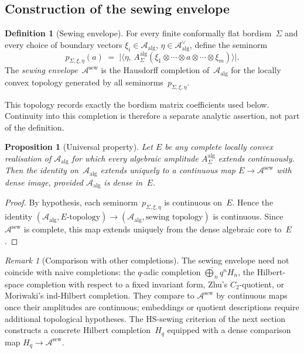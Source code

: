\documentclass[11pt,reqno]{amsart}
\newtheorem{proposition}[theorem]{Proposition}
\theoremstyle{definition}
\newtheorem{definition}[theorem]{Definition}
\theoremstyle{remark}
\newtheorem{remark}[theorem]{Remark}
\newcommand{\cA}{\mathcal{A}}
\numberwithin{equation}{section}
\begin{document}
\subsection{Construction of the sewing
 envelope}\label{subsec:sewing-envelope-construction}

\begin{definition}[Sewing envelope]\label{def:sewing-envelope}
For every finite conformally flat bordism~$\Sigma$ and every
choice of boundary vectors
$\xi_i \in \cA_{\mathrm{alg}}$,
$\eta \in \cA_{\mathrm{alg}}^\vee$, define the seminorm
\begin{equation}\label{eq:sewing-seminorm}
p_{\Sigma,\xi,\eta}(a)
\;=\;
\bigl|\langle \eta,\,
A_\Sigma^{\mathrm{alg}}
(\xi_1 \otimes \cdots \otimes a \otimes \cdots \otimes \xi_m)
\rangle\bigr|.
\end{equation}
The \emph{sewing envelope}~$\cA^{\mathrm{sew}}$ is the
Hausdorff completion of~$\cA_{\mathrm{alg}}$ for the locally
convex topology generated by all
seminorms~$p_{\Sigma,\xi,\eta}$.
\end{definition}

This topology records exactly the bordism matrix coefficients used
below. Continuity into this completion is therefore a separate
analytic assertion, not part of the definition.

\begin{proposition}[Universal property]
\label{prop:sewing-universal}
Let $E$ be any complete locally convex realisation of
$\cA_{\mathrm{alg}}$ for which every algebraic amplitude
$A_\Sigma^{\mathrm{alg}}$ extends continuously.  Then the
identity on~$\cA_{\mathrm{alg}}$ extends uniquely to a
continuous map $E \to \cA^{\mathrm{sew}}$ with dense image, provided
$\cA_{\mathrm{alg}}$ is dense in~$E$.
\end{proposition}

\begin{proof}
By hypothesis, each seminorm~$p_{\Sigma,\xi,\eta}$ is
continuous on~$E$.  Hence the identity
$(\cA_{\mathrm{alg}},E\text{-topology}) \to
(\cA_{\mathrm{alg}},\text{sewing topology})$ is continuous.  Since
$\cA^{\mathrm{sew}}$ is complete, this map extends uniquely from
the dense algebraic core to~$E$.
\end{proof}

\begin{remark}[Comparison with other completions]
\label{rem:completion-comparison}
The sewing envelope need not coincide with naive completions:
the $q$-adic completion
$\widehat{\bigoplus}_n q^n H_n$, the Hilbert-space completion
with respect to a fixed invariant form, Zhu's $C_2$-quotient,
or Moriwaki's ind-Hilbert completion.  They compare to
$\cA^{\mathrm{sew}}$ by continuous maps once their amplitudes are
continuous; embeddings or quotient descriptions require additional
topological hypotheses.  The HS-sewing criterion of the next section
constructs a concrete Hilbert completion~$H_q$ equipped with a dense
comparison map $H_q \to \cA^{\mathrm{sew}}$.
\end{remark}
\end{document}
